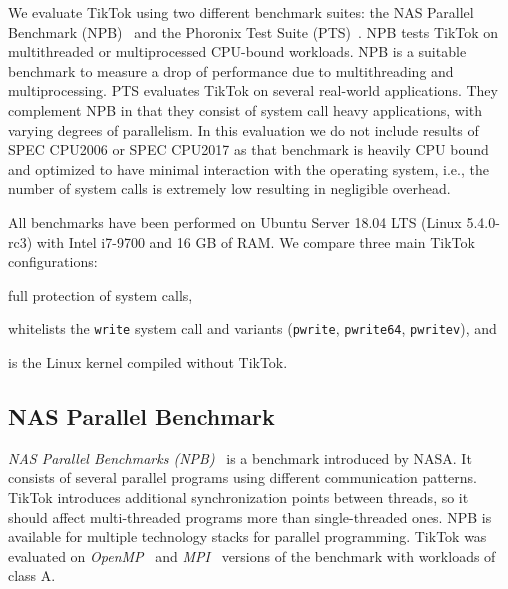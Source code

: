\documentclass[conference]{IEEEtran}
\newcommand{\sysname}{TikTok}
\begin{document}
We evaluate \sysname{} using two different benchmark suites: the NAS Parallel
Benchmark (NPB)~\cite{npb} and the Phoronix Test Suite (PTS)~\cite{pts}. NPB
tests \sysname{} on multithreaded or multiprocessed CPU-bound workloads. NPB is
a suitable benchmark to measure a drop of performance due to multithreading and
multiprocessing. PTS evaluates \sysname{} on several real-world applications.
They complement NPB in that they consist of system call heavy applications, with
varying degrees of parallelism. In this evaluation we do not include results of
SPEC CPU2006 or SPEC CPU2017 as that benchmark is heavily CPU bound and
optimized to have minimal interaction with the operating system, i.e., the
number of system calls is extremely low resulting in negligible overhead.

All benchmarks have been performed on Ubuntu Server 18.04 LTS (Linux 5.4.0-rc3)
with Intel i7-9700 and 16 GB of RAM.
%
We compare three main \sysname{} configurations:
\begin{LaTeXdescription}
  \item[\sysname{} On] full protection of system calls,
  \item[\sysname{} Partial] whitelists the \texttt{write}
system call and variants (\texttt{pwrite}, \texttt{pwrite64}, \texttt{pwritev}), and
  \item[\sysname{} Off] is the Linux kernel compiled without \sysname{}. 
\end{LaTeXdescription}


\subsection{NAS Parallel Benchmark} \label{subsec:npb}

\emph{NAS Parallel Benchmarks (NPB)}~\cite{npb} is a benchmark introduced by
NASA. It consists of several parallel programs using different communication
patterns. \sysname{} introduces additional synchronization points between
threads, so it should affect multi-threaded programs more than single-threaded
ones. NPB is available for multiple technology stacks for parallel programming.
\sysname{} was evaluated on \emph{OpenMP}~\cite{dagum1998openmp} and
\emph{MPI}~\cite{snir1998mpi} versions of the benchmark with workloads of class
A.
\end{document}
